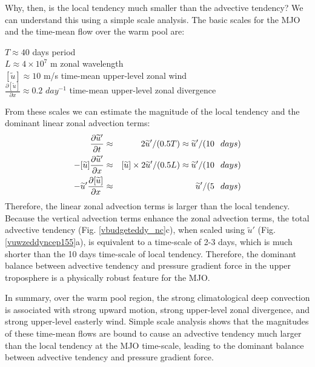 \documentclass[12pt]{article}
\begin{document}
  Why, then, is the local tendency much smaller than the advective
tendency?  We can understand this using a simple scale analysis.
The basic scales for the MJO and the time-mean flow over the warm pool
are:

$T \approx  40$ days \hspace*{1.15in} period\\
\hspace*{0.2in}
$L \approx  4 \times 10^{7}$ m  \hspace*{1.0in} zonal wavelength\\
\hspace*{0.15in}
$[\widetilde{u}]  \approx 10$ m/s  
\hspace*{1.2in} time-mean upper-level zonal wind\\
\hspace*{0.12in}
$\frac{\partial [\widetilde{u}]}{\partial x} \approx 0.2$ $day^{-1}$ 
\hspace*{1.0in} time-mean upper-level zonal divergence

From these scales we can estimate the magnitude of the local tendency and
the dominant linear zonal advection terms:
\begin{eqnarray}
\frac{\partial \widetilde{u} '}{\partial t} 
& \approx & 2 \widetilde{u} '/(0.5T) 
\approx \widetilde{u} '/ (10 \hspace*{0.1in}days)  \nonumber\\
- [\widetilde{u}] \frac{\partial \widetilde{u} '}{\partial x} 
& \approx & [\widetilde{u}] \times 2 \widetilde{u} ' /(0.5 L)
\approx \widetilde{u} '/ (10 \hspace*{0.1in}days)  \nonumber\\
- \widetilde{u} ' \frac{\partial [\widetilde{u}]}{\partial x}
& \approx & \widetilde{u} '/ (5 \hspace*{0.1in}days)  \nonumber
\end{eqnarray}
Therefore, the linear zonal advection terms is larger than the local tendency.
Because the vertical advection terms enhance the zonal advection terms, 
the total advective tendency 
(Fig. \ref{vbudgeteddy_nc}c), when scaled using $\widetilde{u}'$ 
(Fig. \ref{vuwzeddyncep155}a),
is equivalent to a time-scale of 2-3 days, which is much shorter
than the 10 days time-scale of local tendency.
Therefore, the dominant balance between advective tendency and
pressure gradient force in the upper troposphere 
is a physically robust feature for the MJO.

  In summary, over the warm pool region, 
the strong climatological deep convection is
associated with strong upward motion,
strong upper-level zonal divergence, 
and strong upper-level easterly wind.
Simple scale analysis shows that the magnitudes of these time-mean flows
are bound to cause an advective tendency much larger than the local
tendency at the MJO time-scale, leading to the dominant balance between
advective tendency and pressure gradient force.
\\
\end{document}
